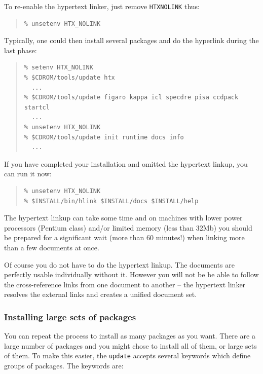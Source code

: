 \documentclass[twoside,11pt]{article}
\renewcommand{\_}{\texttt{\symbol{95}}}
\begin{document}
To re-enable the hypertext linker, just remove \texttt{HTX\_NOLINK} thus:

\begin{quote}
\begin{verbatim}
% unsetenv HTX_NOLINK
\end{verbatim}
\end{quote}

Typically, one could then install several packages and do the hyperlink
during the last phase:

\begin{quote}
\begin{verbatim}
% setenv HTX_NOLINK
% $CDROM/tools/update htx
  ...
% $CDROM/tools/update figaro kappa icl specdre pisa ccdpack startcl
  ...
% unsetenv HTX_NOLINK
% $CDROM/tools/update init runtime docs info
  ...
\end{verbatim}
\end{quote}

If you have completed your installation and omitted the hypertext
linkup, you can run it now:

\begin{quote}
\begin{verbatim}
% unsetenv HTX_NOLINK
% $INSTALL/bin/hlink $INSTALL/docs $INSTALL/help
\end{verbatim}
\end{quote}

The hypertext linkup can take some time and on machines with lower power
processors (Pentium class) and/or limited memory (less than 32Mb) you
should be prepared for a significant wait (more than 60 minutes!) when
linking more than a few documents at once.

Of course you do not have to do the hypertext linkup.  The documents
are perfectly usable individually without it.  However you will not be
be able to follow the cross-reference links from one document to another
-- the hypertext linker resolves the external links and creates a unified
document set.

\subsubsection{Installing large sets of packages}

You can repeat the process to install as many packages as you want.  There
are a large number of packages and you might chose to install all of them,
or large sets of them.  To make this easier, the \texttt{update} accepts
several keywords which define groups of packages.  The keywords are:
\end{document}
